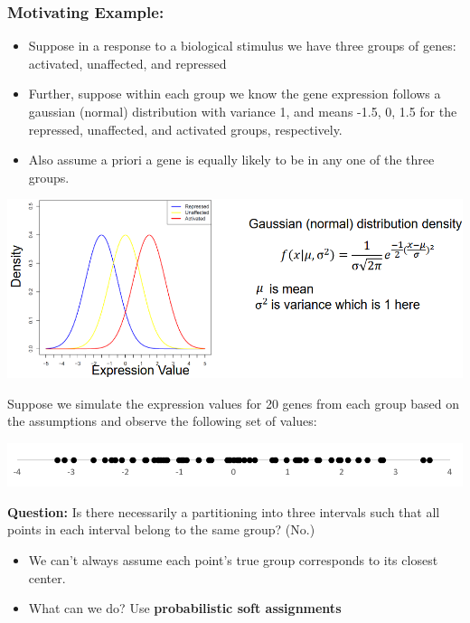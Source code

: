 \documentclass[10pt]{article}
\begin{document}
\subsubsection*{Motivating Example:}
\begin{itemize}
    \item Suppose in a response to a biological stimulus we have three groups of genes: activated, unaffected, and repressed
    \item Further, suppose within each group we know the gene expression follows a gaussian (normal) distribution with variance 1, and means -1.5, 0, 1.5 for the repressed, unaffected, and activated groups, respectively.
    \item Also assume a priori a gene is equally likely to be in any one of the three groups.
\end{itemize}
\begin{center}
    \includegraphics*[width=\textwidth]{W6_29.png}
\end{center}
Suppose we simulate the expression values for 20 genes from each group based on the assumptions and observe the following set of values:
\begin{center}
    \includegraphics*[width=\textwidth]{W6_30.png}
\end{center}
\textbf{Question:} Is there necessarily a partitioning into three intervals such that all points in each interval belong to the same group?   (No.)
\begin{itemize}
    \item We can't always assume each point's true group corresponds to its closest center.
    \item What can we do?  Use \textbf{probabilistic soft assignments}
\end{itemize}
\end{document}
